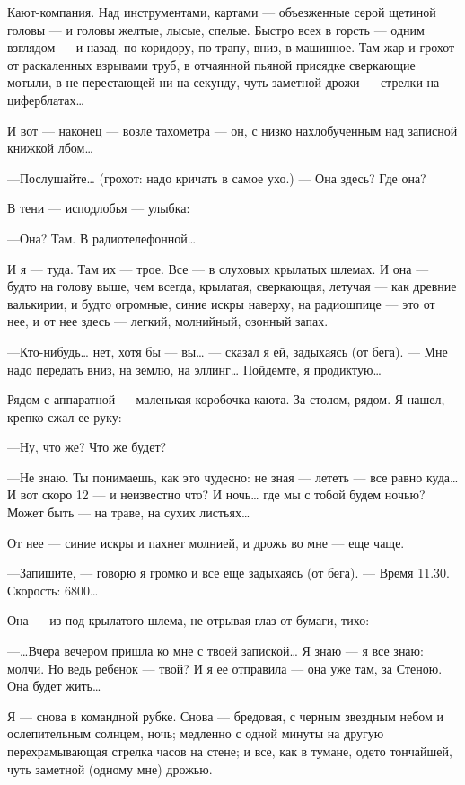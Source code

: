 \documentclass[11pt,openany]{book}
\begin{document}
Кают-компания. Над инструментами, картами --- объезженные серой щетиной головы --- и головы желтые, лысые, спелые. Быстро всех в горсть --- одним взглядом --- и назад, по коридору, по трапу, вниз, в машинное. Там жар и грохот от раскаленных взрывами труб, в отчаянной пьяной присядке сверкающие мотыли, в не перестающей ни на секунду, чуть заметной дрожи --- стрелки на циферблатах\ldots{}

И вот --- наконец --- возле тахометра --- он, с низко нахлобученным над записной книжкой лбом\ldots{}

---Послушайте\ldots{} (грохот: надо кричать в самое ухо.) --- Она здесь? Где она?

В тени --- исподлобья --- улыбка:

---Она? Там. В радиотелефонной\ldots{}

И я --- туда. Там их --- трое. Все --- в слуховых крылатых шлемах. И она --- будто на голову выше, чем всегда, крылатая, сверкающая, летучая --- как древние валькирии, и будто огромные, синие искры наверху, на радиошпице --- это от нее, и от нее здесь --- легкий, молнийный, озонный запах.

---Кто-нибудь\ldots{} нет, хотя бы --- вы\ldots{} --- сказал я ей, задыхаясь (от бега). --- Мне надо передать вниз, на землю, на эллинг\ldots{} Пойдемте, я продиктую\ldots{}

Рядом с аппаратной --- маленькая коробочка-каюта. За столом, рядом. Я нашел, крепко сжал ее руку:

---Ну, что же? Что же будет?

---Не знаю. Ты понимаешь, как это чудесно: не зная --- лететь --- все равно куда\ldots{} И вот скоро 12 --- и неизвестно что? И ночь\ldots{} где мы с тобой будем ночью? Может быть --- на траве, на сухих листьях\ldots{}

От нее --- синие искры и пахнет молнией, и дрожь во мне --- еще чаще.

---Запишите, --- говорю я громко и все еще задыхаясь (от бега). --- Время 11.30. Скорость: 6800\ldots{}

Она --- из-под крылатого шлема, не отрывая глаз от бумаги, тихо:

---\ldots{}Вчера вечером пришла ко мне с твоей запиской\ldots{} Я знаю --- я все знаю: молчи. Но ведь ребенок --- твой? И я ее отправила --- она уже там, за Стеною. Она будет жить\ldots{}

Я --- снова в командной рубке. Снова --- бредовая, с черным звездным небом и ослепительным солнцем, ночь; медленно с одной минуты на другую перехрамывающая стрелка часов на стене; и все, как в тумане, одето тончайшей, чуть заметной (одному мне) дрожью.
\end{document}
